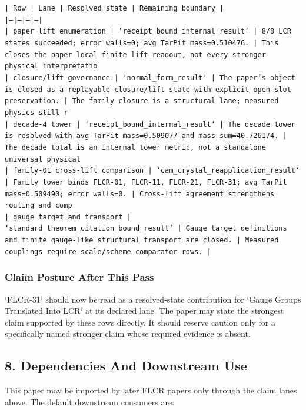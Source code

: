 \documentclass[11pt]{article}
\begin{document}
\noindent\texttt{| Row | Lane | Resolved state | Remaining boundary |}\\
\noindent\texttt{|---|---|---|---|}\\
\noindent\texttt{| paper lift enumeration | `receipt\_bound\_internal\_result` | 8/8 LCR states succeeded; error walls=0; avg TarPit mass=0.510476. | This closes the paper-local finite lift readout, not every stronger physical interpretatio}\\
\noindent\texttt{| closure/lift governance | `normal\_form\_result` | The paper's object is closed as a replayable closure/lift state with explicit open-slot preservation. | The family closure is a structural lane; measured physics still r}\\
\noindent\texttt{| decade-4 tower | `receipt\_bound\_internal\_result` | The decade tower is resolved with avg TarPit mass=0.509077 and mass sum=40.726174. | The decade total is an internal tower metric, not a standalone universal physical }\\
\noindent\texttt{| family-01 cross-lift comparison | `cam\_crystal\_reapplication\_result` | Family tower binds FLCR-01, FLCR-11, FLCR-21, FLCR-31; avg TarPit mass=0.509490; error walls=0. | Cross-lift agreement strengthens routing and comp}\\
\noindent\texttt{| gauge target and transport | `standard\_theorem\_citation\_bound\_result` | Gauge target definitions and finite gauge-like structural transport are closed. | Measured couplings require scale/scheme comparator rows. |}\\

\subsubsection*{Claim Posture After This Pass}

`FLCR-31` should now be read as a resolved-state contribution for `Gauge Groups Translated Into LCR` at its declared lane. The paper may state the strongest claim supported by these rows directly. It should reserve caution only for a specifically named stronger claim whose required evidence is absent.

\subsection*{8. Dependencies And Downstream Use}

This paper may be imported by later FLCR papers only through the claim lanes
above. The default downstream consumers are:
\end{document}

